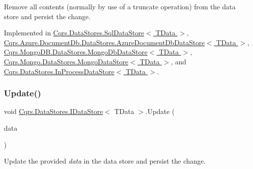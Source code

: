 Remove all contents (normally by use of a truncate operation) from the data store and persist the change. 



Implemented in \hyperlink{classCqrs_1_1DataStores_1_1SqlDataStore_abb88337dccf3d5372f6b0920d5d26ebd_abb88337dccf3d5372f6b0920d5d26ebd}{Cqrs.\+Data\+Stores.\+Sql\+Data\+Store$<$ T\+Data $>$}, \hyperlink{classCqrs_1_1Azure_1_1DocumentDb_1_1DataStores_1_1AzureDocumentDbDataStore_a0d72cc318e98e01b3dbed86d412a8778_a0d72cc318e98e01b3dbed86d412a8778}{Cqrs.\+Azure.\+Document\+Db.\+Data\+Stores.\+Azure\+Document\+Db\+Data\+Store$<$ T\+Data $>$}, \hyperlink{classCqrs_1_1MongoDB_1_1DataStores_1_1MongoDbDataStore_ac0cb8626e8f8ab0275a31e88a920ee3e_ac0cb8626e8f8ab0275a31e88a920ee3e}{Cqrs.\+Mongo\+D\+B.\+Data\+Stores.\+Mongo\+Db\+Data\+Store$<$ T\+Data $>$}, \hyperlink{classCqrs_1_1Mongo_1_1DataStores_1_1MongoDataStore_a878966ea796321cae54c3c619e3178d5_a878966ea796321cae54c3c619e3178d5}{Cqrs.\+Mongo.\+Data\+Stores.\+Mongo\+Data\+Store$<$ T\+Data $>$}, and \hyperlink{classCqrs_1_1DataStores_1_1InProcessDataStore_acd350f7abef7311064434ae31a50755b_acd350f7abef7311064434ae31a50755b}{Cqrs.\+Data\+Stores.\+In\+Process\+Data\+Store$<$ T\+Data $>$}.

\mbox{\label{interfaceCqrs_1_1DataStores_1_1IDataStore_a6d5d4dd572de8db01ff0c48d37faefa7_a6d5d4dd572de8db01ff0c48d37faefa7}} 
\subsubsection{\texorpdfstring{Update()}{Update()}}
{\footnotesize\ttfamily void \hyperlink{interfaceCqrs_1_1DataStores_1_1IDataStore}{Cqrs.\+Data\+Stores.\+I\+Data\+Store}$<$ T\+Data $>$.Update (\begin{DoxyParamCaption}\item[{T\+Data}]{data }\end{DoxyParamCaption})}



Update the provided {\itshape data}  in the data store and persist the change. 




